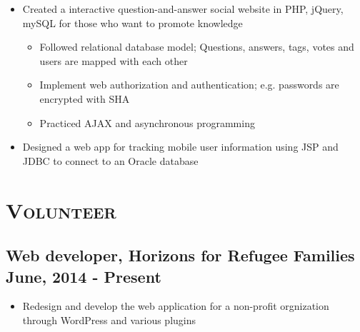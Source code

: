 \documentclass[11.7pt,letterpaper]{article}
\begin{document}
\begin{minipage}{\textwidth}
\begin{itemize}
 \item Created a interactive question-and-answer social website in PHP, jQuery,  mySQL for those who want to promote knowledge
 \begin{itemize}
 \item Followed relational database model; Questions, answers, tags, votes and users are mapped with each other
 \item Implement web authorization and authentication; e.g. passwords are encrypted with SHA
 \item Practiced AJAX and asynchronous programming
\end{itemize} 
 \item Designed a web app for tracking mobile user information using JSP and JDBC to connect to an Oracle database

\end{itemize}



\vspace{-1mm}
\section{\scshape Volunteer}
\vspace{-2mm}
\subsection{Web developer,  Horizons for Refugee Families \hfill June, 2014 - Present}

\begin{itemize}
	\item Redesign and develop the web application for a non-profit orgnization through WordPress and various plugins
\end{itemize}
\vspace{-1mm}



\begin{adjustwidth}{2em}{0pt}

\end{adjustwidth}


\end{minipage}
\end{document}
